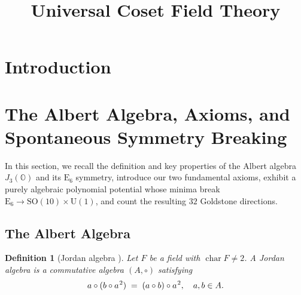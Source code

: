 \documentclass[pdflatex,sn-mathphys-num]{sn-jnl}
\theoremstyle{thmstyleone}
\theoremstyle{thmstyletwo}%
\theoremstyle{thmstylethree}%
\newtheorem{definition}{Definition}%
\newcommand{\SO}[1]{\mathrm{SO(#1)}}
\newcommand{\U}[1]{\mathrm{U(#1)}}
\newcommand{\E}[1]{\mathrm{E_{#1}}}
\newcommand{\SOTen}{\SO{10}}
\newcommand{\UOne}{\U{1}}
\newcommand{\ESix}{\E{6}}
\newcommand{\SOTenXUOne}{\SOTen \times \UOne}
\newcommand{\sm}{\hspace{.065em}}
\newcommand{\smexp}[1]{^{\sm #1}}
\begin{document}
\title[Universal Coset Field Theory]{Universal Coset Field Theory}

\author*[1]{ }





\maketitle

\section{Introduction}

\section{The Albert Algebra, Axioms, and Spontaneous Symmetry Breaking}
\label{sec:AxiomsAlbertSSB}

In this section, we recall the definition and key properties of the Albert algebra $J_{3}(\mathbb O)$ and its $\ESix$ symmetry,
introduce our two fundamental axioms,
exhibit a purely algebraic polynomial potential whose minima break $\ESix\to \SOTenXUOne$,
and count the resulting $32$ Goldstone directions.

\subsection{The Albert Algebra}
\label{subsec:Albert}

\begin{definition}[Jordan algebra {\cite{Jacobson:1968}}]
Let $F$ be a field with $\operatorname{char} F \neq 2$.  
A \emph{Jordan algebra} is a commutative algebra $(A,\circ)$ satisfying
\[
  a\circ(b\circ a\smexp{2}) \;=\;(a\circ b)\circ a\smexp{2},
  \quad a,b\in A.
\]
\end{definition}
\end{document}

